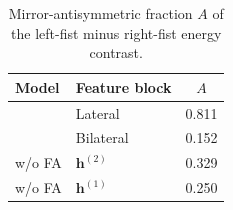 \begin{table}[t]
\centering
\small
\caption{Mirror-antisymmetric fraction $A$ of the left-fist minus right-fist energy contrast.}
\label{tab:mwm-physionet-symmetry}
\begin{tabular}{llc}
\toprule
Model & Feature block & $A$ \\
\midrule
\mwm{} & Lateral & 0.811 \\
\mwm{} & Bilateral & 0.152 \\
w/o FA & $\mathbf{h}^{(2)}$ & 0.329 \\
w/o FA & $\mathbf{h}^{(1)}$ & 0.250 \\
\bottomrule
\end{tabular}
\end{table}
